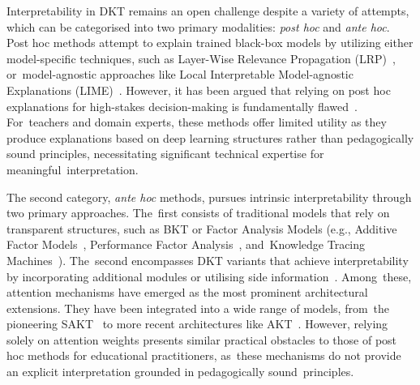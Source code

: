 \documentclass[applsci,article,accept,moreauthors,pdftex]{Definitions/mdpi}
\begin{document}
Interpretability in DKT remains an open challenge despite a variety of attempts, which can be categorised into two primary modalities: \textit{post hoc} and \textit{ante hoc}. Post hoc methods attempt to explain trained black-box models by utilizing either model-specific techniques, such as Layer-Wise Relevance Propagation (LRP)~\citep{bach2015pixel}, or~model-agnostic approaches like Local Interpretable Model-agnostic Explanations (LIME)~\citep{ribeiro2016should}. However, it has been argued that relying on post hoc explanations for high-stakes decision-making is fundamentally flawed~\citep{rudin2019stop}. For~teachers and domain experts, these methods offer limited utility as they produce explanations based on deep learning structures rather than pedagogically sound principles, necessitating significant technical expertise for meaningful~interpretation.

The second category, \textit{ante hoc} methods, pursues intrinsic interpretability through two primary approaches. The~first consists of traditional models that rely on transparent structures, such as BKT or Factor Analysis Models (e.g., Additive Factor Models~\citep{cen2008comparing}, Performance Factor Analysis~\citep{pavlik2009performance}, and~Knowledge Tracing Machines~\citep{vie2019knowledge}). The~second encompasses DKT variants that achieve interpretability by incorporating additional modules or {utilising} side information~\citep{bai2024survey}. Among~these, attention mechanisms have emerged as the most prominent architectural extensions. They have been integrated into a wide range of models, from~the pioneering SAKT~\citep{Pandey2019384} to more recent architectures like AKT~\citep{ghosh2020context}. However, relying solely on attention weights presents similar practical obstacles to those of post hoc methods for educational practitioners, as~these mechanisms do not provide an explicit interpretation grounded in pedagogically sound~principles. 
\end{document}
